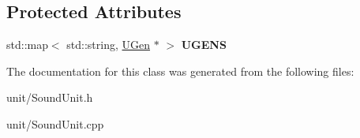 \subsection*{Protected Attributes}
\begin{DoxyCompactItemize}
\item 
std\+::map$<$ std\+::string, \hyperlink{classUGen}{U\+Gen} $\ast$ $>$ {\bfseries U\+G\+E\+NS}\hypertarget{classSoundUnit_aa7bb4be0804fdd7a68bd767795592da1}{}\label{classSoundUnit_aa7bb4be0804fdd7a68bd767795592da1}

\end{DoxyCompactItemize}


The documentation for this class was generated from the following files\+:\begin{DoxyCompactItemize}
\item 
unit/Sound\+Unit.\+h\item 
unit/Sound\+Unit.\+cpp\end{DoxyCompactItemize}
